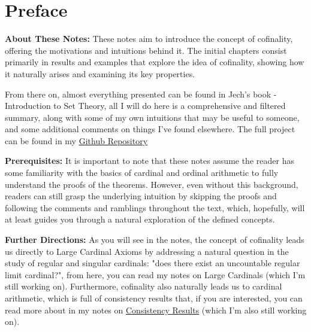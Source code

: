 \chapter*{Preface}

\textbf{About These Notes:} These notes aim to introduce the concept of cofinality, offering the motivations and intuitions behind it. The initial chapters consist primarily in results and examples that explore the idea of cofinality, showing how it naturally arises and examining its key properties.

From there on, almost everything presented can be found in Jech's book \cite{bib:jech} - Introduction to Set Theory, all I will do here is a comprehensive and filtered summary, along with some of my own intuitions that may be useful to someone, and some additional comments on things I've found elsewhere. The full project can be found in my \href{https://github.com/Xennonio/Cofinality/tree/main}{Github Repository}

\textbf{Prerequisites:} It is important to note that these notes assume the reader has some familiarity with the basics of cardinal and ordinal arithmetic to fully understand the proofs of the theorems. However, even without this background, readers can still grasp the underlying intuition by skipping the proofs and following the comments and ramblings throughout the text, which, hopefully, will at least guides you through a natural exploration of the defined concepts.

\textbf{Further Directions:} As you will see in the notes, the concept of cofinality leads us directly to Large Cardinal Axioms by addressing a natural question in the study of regular and singular cardinals: "does there exist an uncountable regular limit cardinal?", from here, you can read my notes on Large Cardinals (which I'm still working on). Furthermore, cofinality also naturally leads us to cardinal arithmetic, which is full of consistency results that, if you are interested, you can read more about in my notes on \href{https://github.com/Xennonio/Consistency-Results}{Consistency Results} (which I'm also still working on).